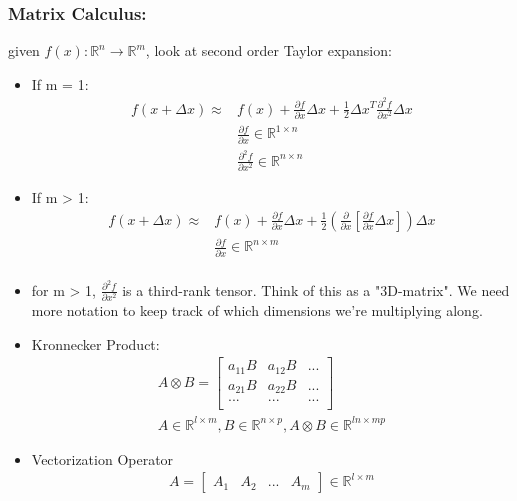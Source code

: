 \subsubsection{Matrix Calculus:}
given $f(x): \mathbb{R}^n \to \mathbb{R}^m$, look at second order Taylor expansion:
\begin{itemize}
    \item If m = 1:
    \begin{align}
        f(x + \Delta x) \approx & f(x) + \frac{\partial f}{\partial x} \Delta x + \frac{1}{2}\Delta x^T \frac{\partial^2f}{\partial x^2}\Delta x \\
        & \frac{\partial f}{\partial x} \in \mathbb{R}^{1 \times n} \\ 
        & \frac{\partial^2f}{\partial x^2} \in \mathbb{R}^{n \times n}
    \end{align}
    \item If m > 1:
    \begin{align}
        f(x + \Delta x) \approx & f(x) + \frac{\partial f}{\partial x} \Delta x + \frac{1}{2}(\frac{\partial}{\partial x} [\frac{\partial f}{\partial x} \Delta x]) \Delta x \\
        & \frac{\partial f}{\partial x} \in \mathbb{R}^{n \times m} \\ 
    \end{align}
    \item for m > 1, $\frac{\partial^2f}{\partial x^2}$ is a third-rank tensor. Think of this as a "3D-matrix". We need more notation to keep track of which dimensions we're multiplying along.
    \item Kronnecker Product:
    \begin{align}
        A \otimes B = 
        \begin{bmatrix}
            a_{11}B & a_{12}B & ... \\
            a_{21}B & a_{22}B & ... \\
            ... & ... & ... \\
        \end{bmatrix} \\
        A \in \mathbb{R}^{l \times m}, B \in \mathbb{R}^{n \times p}, A \otimes B \in \mathbb{R}^{ln \times mp}
    \end{align}
    \item Vectorization Operator
    \begin{align}
        A = \begin{bmatrix}
            A_1 & A_2 & ... & A_m
        \end{bmatrix} \in \mathbb{R}^{l \times m}\\

\end{align}
\end{itemize}
